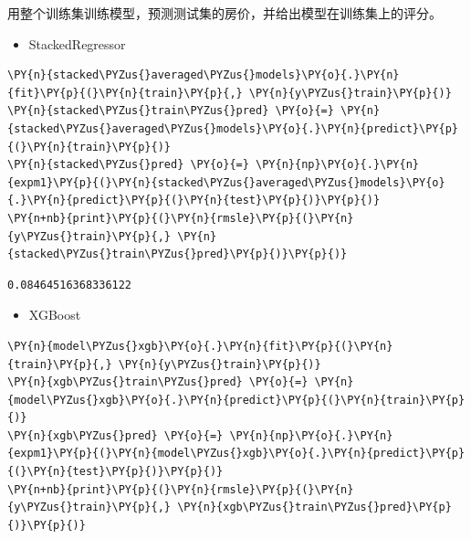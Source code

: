 \documentclass[no-math]{YangThesis}
\begin{document}
用整个训练集训练模型，预测测试集的房价，并给出模型在训练集上的评分。

\begin{itemize}
	\tightlist
	\item
	StackedRegressor
\end{itemize}

\begin{tcolorbox}[breakable, size=fbox, boxrule=1pt, pad at break*=1mm,colback=cellbackground, colframe=cellborder]
	\begin{Verbatim}[commandchars=\\\{\}]
\PY{n}{stacked\PYZus{}averaged\PYZus{}models}\PY{o}{.}\PY{n}{fit}\PY{p}{(}\PY{n}{train}\PY{p}{,} \PY{n}{y\PYZus{}train}\PY{p}{)}
\PY{n}{stacked\PYZus{}train\PYZus{}pred} \PY{o}{=} \PY{n}{stacked\PYZus{}averaged\PYZus{}models}\PY{o}{.}\PY{n}{predict}\PY{p}{(}\PY{n}{train}\PY{p}{)}
\PY{n}{stacked\PYZus{}pred} \PY{o}{=} \PY{n}{np}\PY{o}{.}\PY{n}{expm1}\PY{p}{(}\PY{n}{stacked\PYZus{}averaged\PYZus{}models}\PY{o}{.}\PY{n}{predict}\PY{p}{(}\PY{n}{test}\PY{p}{)}\PY{p}{)}
\PY{n+nb}{print}\PY{p}{(}\PY{n}{rmsle}\PY{p}{(}\PY{n}{y\PYZus{}train}\PY{p}{,} \PY{n}{stacked\PYZus{}train\PYZus{}pred}\PY{p}{)}\PY{p}{)}
	\end{Verbatim}
\end{tcolorbox}

\begin{Verbatim}[commandchars=\\\{\}]
0.08464516368336122
\end{Verbatim}

\begin{itemize}
	\tightlist
	\item
	XGBoost
\end{itemize}

\begin{tcolorbox}[breakable, size=fbox, boxrule=1pt, pad at break*=1mm,colback=cellbackground, colframe=cellborder]
	\begin{Verbatim}[commandchars=\\\{\}]
\PY{n}{model\PYZus{}xgb}\PY{o}{.}\PY{n}{fit}\PY{p}{(}\PY{n}{train}\PY{p}{,} \PY{n}{y\PYZus{}train}\PY{p}{)}
\PY{n}{xgb\PYZus{}train\PYZus{}pred} \PY{o}{=} \PY{n}{model\PYZus{}xgb}\PY{o}{.}\PY{n}{predict}\PY{p}{(}\PY{n}{train}\PY{p}{)}
\PY{n}{xgb\PYZus{}pred} \PY{o}{=} \PY{n}{np}\PY{o}{.}\PY{n}{expm1}\PY{p}{(}\PY{n}{model\PYZus{}xgb}\PY{o}{.}\PY{n}{predict}\PY{p}{(}\PY{n}{test}\PY{p}{)}\PY{p}{)}
\PY{n+nb}{print}\PY{p}{(}\PY{n}{rmsle}\PY{p}{(}\PY{n}{y\PYZus{}train}\PY{p}{,} \PY{n}{xgb\PYZus{}train\PYZus{}pred}\PY{p}{)}\PY{p}{)}
	\end{Verbatim}
\end{tcolorbox}
\end{document}

